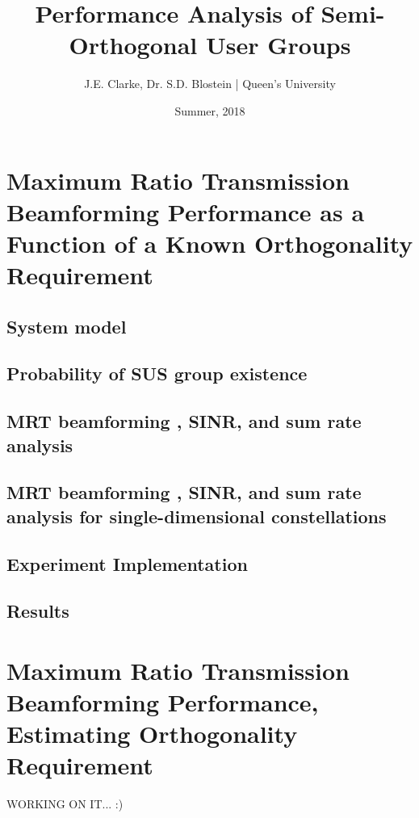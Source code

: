\documentclass[11pt]{article}
\title{Performance Analysis of Semi-Orthogonal User Groups}
\author{J.E. Clarke, Dr. S.D. Blostein | Queen's University}
\date{Summer, 2018}
\begin{document}
	\maketitle
	\newpage
    \section{Maximum Ratio Transmission Beamforming Performance as a Function of a Known Orthogonality Requirement}
    	\subsection{System model}
            
        \subsection{Probability of SUS group existence}
            
        \subsection{MRT beamforming , SINR, and sum rate analysis}\label{sec:linear_sinr}
            
        \subsection{MRT beamforming , SINR, and sum rate analysis for single-dimensional constellations}\label{sec:wl_sinr}
            
        \subsection{Experiment Implementation}
            
        \subsection{Results}
            

    \newpage
    \section{Maximum Ratio Transmission Beamforming Performance, Estimating Orthogonality Requirement}
    WORKING ON IT... :)
    \newpage	
 	\begingroup
 		\renewcommand{\section}[2]{}%
 		
 		
 	\endgroup
\end{document}
